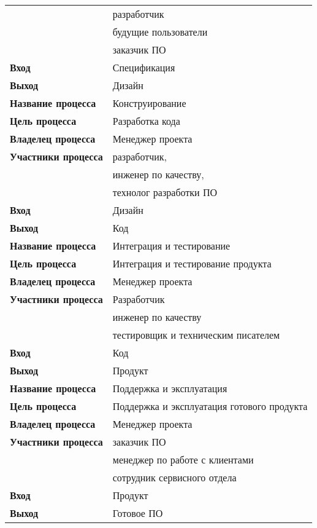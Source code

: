 \documentclass[a4paper,14pt]{extarticle}
\begin{document}
\begin{longtable}{|l|l|}
	\multicolumn{ 1}{|l|}{} & разработчик \\ \cline{ 2- 2}
	\multicolumn{ 1}{|l|}{} & будущие пользователи \\ \cline{ 2- 2}
	\multicolumn{ 1}{|l|}{} & заказчик ПО \\ \hline
	\textbf{Вход} & Спецификация \\ \hline
	\textbf{Выход} & Дизайн \\ \hline
	\textbf{Название процесса} & Конструирование \\ \hline
	\textbf{Цель процесса} & Разработка кода \\ \hline
	\textbf{Владелец процесса} & Менеджер проекта \\ \hline
	\textbf{Участники процесса} & разработчик, \\ \hline
	\textbf{} & инженер по качеству, \\ \hline
	\textbf{} & технолог разработки ПО \\ \hline
	\textbf{Вход} & Дизайн \\ \hline
	\textbf{Выход} & Код \\ \hline
	\textbf{Название процесса} & Интеграция и тестирование \\ \hline
	\textbf{Цель процесса} & Интеграция и тестирование продукта \\ \hline
	\textbf{Владелец процесса} & Менеджер проекта \\ \hline
	\multicolumn{ 1}{|c|}{\textbf{Участники процесса}} & Разработчик \\ \cline{ 2- 2}
	\multicolumn{ 1}{|l|}{} & инженер по качеству \\ \cline{ 2- 2}
	\multicolumn{ 1}{|l|}{} & тестировщик и техническим писателем \\ \hline
	\textbf{Вход} & Код \\ \hline
	\textbf{Выход} & Продукт \\ \hline
	\textbf{Название процесса} & Поддержка и эксплуатация \\ \hline
	\textbf{Цель процесса} & Поддержка и эксплуатация готового продукта \\ \hline
	\textbf{Владелец процесса} & Менеджер проекта \\ \hline
	\multicolumn{ 1}{|c|}{\textbf{Участники процесса}} & заказчик ПО \\ \cline{ 2- 2}
	\multicolumn{ 1}{|l|}{} & менеджер по работе с клиентами \\ \cline{ 2- 2}
	\multicolumn{ 1}{|l|}{} & сотрудник сервисного отдела \\ \hline
	\textbf{Вход} & Продукт \\ \hline
	\textbf{Выход} & Готовое ПО 
	\label{long}
\end{longtable}
\end{document}
